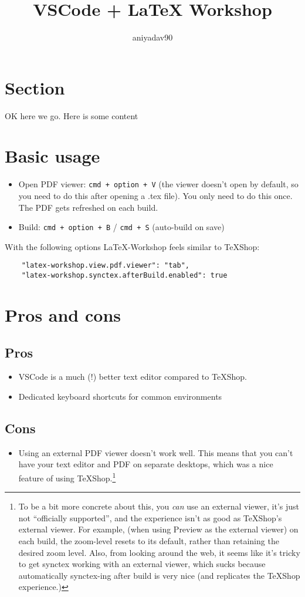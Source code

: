 \documentclass[12pt,letter]{article}
\title{VSCode + LaTeX Workshop}
\author{aniyadav90}
\begin{document}
\maketitle
\section{Section}
OK here we go. Here is some content

\section{Basic usage}
\begin{itemize}
    \item Open PDF viewer: \texttt{cmd + option + V} (the viewer doesn't open by default, so you need to do this after opening a .tex file). You only need to do this once. The PDF gets refreshed on each build.
    \item Build: \texttt{cmd + option + B} / \texttt{cmd + S} (auto-build on save)
\end{itemize}
With the following options LaTeX-Workshop feels similar to TeXShop:
\begin{verbatim}
    "latex-workshop.view.pdf.viewer": "tab",
    "latex-workshop.synctex.afterBuild.enabled": true
\end{verbatim}

\section{Pros and cons}
\subsection{Pros}
\begin{itemize}
    \item VSCode is a much (!) better text editor compared to TeXShop.
    \item Dedicated keyboard shortcuts for common environments
\end{itemize}
\subsection{Cons}
\begin{itemize}
    \item Using an external PDF viewer doesn't work well. This means that you can't have your text editor and PDF on separate desktops, which was a nice feature of using TeXShop.\footnote{To be a bit more concrete about this, you \textit{can} use an external viewer, it's just not ``officially supported'', and the experience isn't as good as TeXShop's external viewer. For example, (when using Preview as the external viewer) on each build, the zoom-level resets to its default, rather than retaining the desired zoom level. Also, from looking around the web, it seems like it's tricky to get synctex working with an external viewer, which sucks because automatically synctex-ing after build is very nice (and replicates the TeXShop experience.)} 
\end{itemize}
\end{document}
